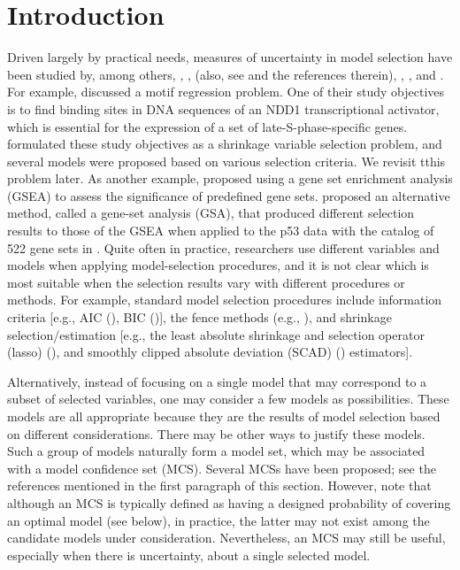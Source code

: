 \documentclass[12pt]{article} %
\renewcommand{\theequation}{\thesection\arabic{equation}}
\theoremstyle{definition}
\begin{document}
\def\thefigure{\arabic{figure}}
\def\thetable{\arabic{table}}

\renewcommand{\theequation}{\thesection.\arabic{equation}}


\fontsize{12}{14pt plus.8pt minus .6pt}\selectfont



\section{Introduction}
\label{s:intro}

Driven largely by practical needs, measures of uncertainty in model selection have been studied by, among others, \citet{Hansen}, \citet{Ferrari2015}, \citet{Lubke2016} (also, see \citet{Lubke2017} and the references therein), \citet{Zheng2019}, \citet{Li2019}, and \citet{Liu2021}. For example, \citet{Conlon2003} discussed a motif regression problem. One of their study objectives is to find binding sites in DNA sequences of an NDD1 transcriptional activator, which is essential for the expression of a set of late-S-phase-specific genes. \citet{Pang2016} formulated these study objectives as a shrinkage variable selection problem, and several models were proposed based on various selection criteria. We revisit tthis problem later. As another example, \citet{Subramanian} proposed using a gene set enrichment analysis (GSEA) to assess the significance of predefined gene sets. \citet{efron2007} proposed an alternative method, called a gene-set analysis (GSA), that produced different selection results to those of the GSEA when applied to the p53 data with the catalog of 522 gene sets in \citet{Subramanian}. Quite often in practice, researchers use different variables and models when applying model-selection procedures, and it is not clear which is most suitable when the selection results vary with different procedures or methods. For example, standard model selection procedures include information criteria [e.g., AIC (\citet{1973}), BIC (\citet{Schwarz})], the fence methods (e.g., \citet{Jiang2016}), and shrinkage selection/estimation [e.g., the least absolute shrinkage and selection operator (lasso) (\citet{Tibshirani1996}), and smoothly clipped absolute deviation (SCAD) (\citet{fan2001}) estimators].

Alternatively, instead of focusing on a single model that may correspond to a subset of selected variables, one may consider a few models as possibilities. These models are all appropriate because they are the results of model selection based on different considerations. There may be other ways to justify these models. Such a group of models naturally form a model set, which may be associated with a model confidence set (MCS). Several MCSs have been proposed; see the references mentioned in the first paragraph of this section. However, note that although an MCS is typically defined as having a designed probability of covering an optimal model (see below), in practice, the latter may not exist among the candidate models under consideration. Nevertheless, an MCS may still be useful, especially when there is uncertainty, about a single selected model.
\end{document}
